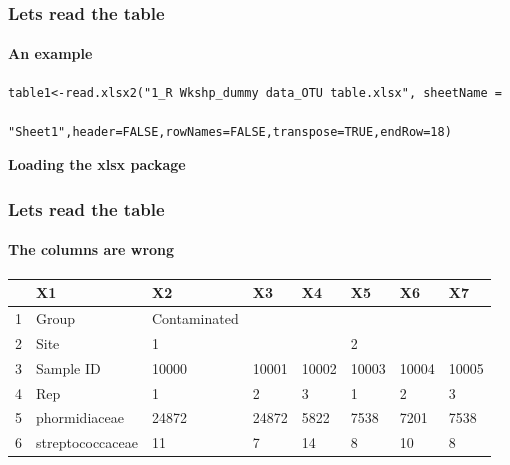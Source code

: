 \documentclass{article}\usepackage[]{graphicx}\usepackage[]{color}
\makeatletter
\newenvironment{kframe}{%
 \def\at@end@of@kframe{}%
 \ifinner\ifhmode%
  \def\at@end@of@kframe{\end{minipage}}%
  \begin{minipage}{\columnwidth}%
 \fi\fi%
 \def\FrameCommand##1{\hskip\@totalleftmargin \hskip-\fboxsep
 \colorbox{shadecolor}{##1}\hskip-\fboxsep
     \hskip-\linewidth \hskip-\@totalleftmargin \hskip\columnwidth}%
 \MakeFramed {\advance\hsize-\width
   \@totalleftmargin\z@ \linewidth\hsize
   \@setminipage}}%
 {\par\unskip\endMakeFramed%
 \at@end@of@kframe}
\newenvironment{knitrout}{}{} %
\makeatother
\begin{document}
\begin{frame}[fragile]
  \frametitle{Lets read the table}
  \framesubtitle{An example}
\begin{lstlisting} 
table1<-read.xlsx2("1_R Wkshp_dummy data_OTU table.xlsx", sheetName = 

"Sheet1",header=FALSE,rowNames=FALSE,transpose=TRUE,endRow=18)
\end{lstlisting}
{\bf Loading the xlsx package}  
\begin{knitrout}
\color{fgcolor}\begin{kframe}


{\ttfamily\noindent\itshape\color{messagecolor}{\#\# Loading required package: xlsx}}

{\ttfamily\noindent\color{warningcolor}{\#\# Warning: package 'xlsx' was built under R version 3.1.3}}

{\ttfamily\noindent\itshape\color{messagecolor}{\#\# Loading required package: rJava}}

{\ttfamily\noindent\color{warningcolor}{\#\# Warning: package 'rJava' was built under R version 3.1.3}}

{\ttfamily\noindent\itshape\color{messagecolor}{\#\# Loading required package: methods\\\#\# Loading required package: xlsxjars\\\#\# Loading required package: xtable}}\end{kframe}
\end{knitrout}
\end{frame}
\begin{frame}[fragile]
  \frametitle{Lets read the table}
  \framesubtitle{The columns are wrong}
\begin{table}[ht]
\centering
\begin{tabular}{rlllllll}
  \hline
 & X1 & X2 & X3 & X4 & X5 & X6 & X7 \\ 
  \hline
1 & Group & Contaminated &  &  &  &  &  \\ 
  2 & Site & 1 &  &  & 2 &  &  \\ 
  3 & Sample ID & 10000 & 10001 & 10002 & 10003 & 10004 & 10005 \\ 
  4 & Rep & 1 & 2 & 3 & 1 & 2 & 3 \\ 
  5 & phormidiaceae & 24872 & 24872 & 5822 & 7538 & 7201 & 7538 \\ 
  6 & streptococcaceae & 11 & 7 & 14 & 8 & 10 & 8 \\ 
   \hline
\end{tabular}
\end{table}

\clearpage
\end{frame}
\end{document}
